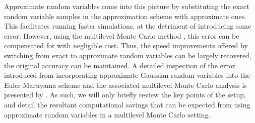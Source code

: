 \documentclass[manuscript,review]{acmart}
\begin{document}
Approximate random variables come into this picture by substituting the exact random variable samples in the approximation scheme with approximate ones. This facilitates running faster simulations, at the detriment of introducing some error. However, using the multilevel Monte Carlo method \citep{giles2008multilevel}, this error can be compensated for with negligible cost. Thus, the speed improvements offered by switching from exact to approximate random variables can be largely recovered, the original accuracy can be maintained. A detailed inspection of the error introduced from incorporating approximate Gaussian random variables into the Euler-Maruyama scheme and the associated multilevel Monte Carlo analysis is presented by \citet{giles2020approximate}. As such, we will only briefly review the key points of the setup, and detail the resultant computational savings that can be expected from using approximate random variables in a multilevel Monte Carlo setting. 
\end{document}

